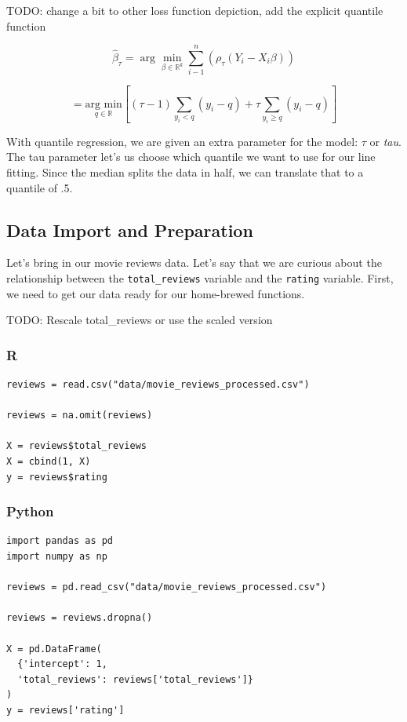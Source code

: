 \documentclass[
  letterpaper,
]{krantz}
\begin{document}
TODO: change a bit to other loss function depiction, add the explicit
quantile function

\[
\hat\beta_\tau = \arg \min_{\beta \in \mathbb{R}^k} \sum_{i-1}^n(\rho_\tau(Y_i-X_i\beta))
\]

\[
=\underset{q\in \mathbb{R}}{\mbox{arg min}}  \left[(\tau - 1)\sum_{y_{i}<q}(y_{i}-q)+\tau\sum_{y_{i}\geq q}(y_{i}-q) \right]
\]

With quantile regression, we are given an extra parameter for the model:
\(\tau\) or \emph{tau}. The tau parameter let's us choose which quantile
we want to use for our line fitting. Since the median splits the data in
half, we can translate that to a quantile of .5.

\subsection{Data Import and Preparation}\label{sec-quantile-data}

Let's bring in our movie reviews data. Let's say that we are curious
about the relationship between the \texttt{total\_reviews} variable and
the \texttt{rating} variable. First, we need to get our data ready for
our home-brewed functions.

TODO: Rescale total\_reviews or use the scaled version

\subsubsection{R}

\begin{verbatim}
reviews = read.csv("data/movie_reviews_processed.csv")

reviews = na.omit(reviews)

X = reviews$total_reviews
X = cbind(1, X)
y = reviews$rating
\end{verbatim}

\subsubsection{Python}

\begin{verbatim}
import pandas as pd
import numpy as np

reviews = pd.read_csv("data/movie_reviews_processed.csv")

reviews = reviews.dropna()

X = pd.DataFrame(
  {'intercept': 1, 
  'total_reviews': reviews['total_reviews']}
)
y = reviews['rating']
\end{verbatim}
\end{document}
